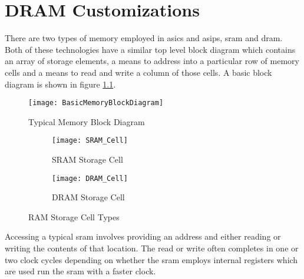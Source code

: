 
\chapter{DRAM Customizations}
\label{sec:DRAM Customizations}

There are two types of memory employed in \acp{asic} and \acp{asip}, \acf{sram} and \acf{dram}.
Both of these technologies have a similar top level block diagram which contains an array of storage elements, a means to address into a particular row of memory cells and a means to read and write a column of those cells.
A basic block diagram is shown in figure \ref{fig:MemoryBlockDiagram}.
\begin{figure}[!t]
\centering
\captionsetup{justification=centering}
\centerline{
\mbox{\texttt{[image: BasicMemoryBlockDiagram]}}
}
\caption{Typical Memory Block Diagram \cite{Jacob:2007:MSC:1543376}}
\label{fig:MemoryBlockDiagram}
\end{figure}


\begin{figure}
\centering
\begin{subfigure}{.45\textwidth}
  \centering
  \texttt{[image: SRAM\_Cell]}
  \captionsetup{justification=centering, skip=5pt}
  \vspace{-6pt}
  \caption{SRAM Storage Cell \cite{Jacob:2007:MSC:1543376}}
  \label{fig:SRAM Cell}
\end{subfigure}%
\begin{subfigure}{.45\textwidth}
  \centering
  \texttt{[image: DRAM\_Cell]}
  \captionsetup{justification=centering, skip=5pt}
  \vspace{20pt}
  \caption{DRAM Storage Cell \cite{Jacob:2007:MSC:1543376}}
  \label{fig:DRAM Cell}
\end{subfigure}
\captionsetup{justification=centering, skip=12pt}
\caption{RAM Storage Cell Types}
\label{fig:Memory Storage Cells}
\end{figure}


Accessing a typical \ac{sram} involves providing an address and either reading or writing the contents of that location. 
The read or write often completes in one or two clock cycles depending on whether the \ac{sram} employs internal registers which are used run the \ac{sram} with a faster clock.

